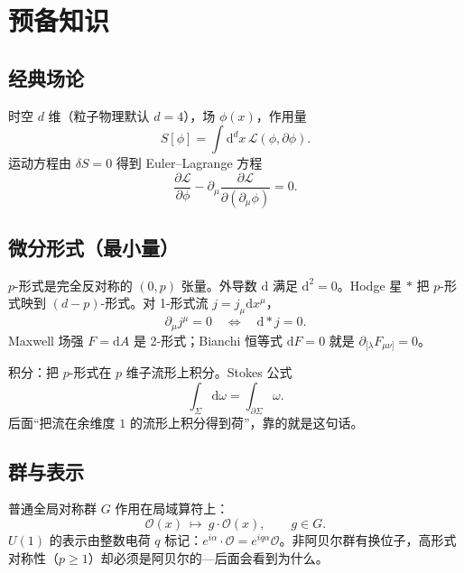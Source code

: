 \documentclass[11pt,a4paper]{article}
\theoremstyle{definition}
\theoremstyle{plain}
\theoremstyle{remark}
\newcommand{\dd}{\mathrm{d}}
\begin{document}
\section{预备知识}
\label{sec:prereq}

\subsection{经典场论}

时空 $d$ 维（粒子物理默认 $d=4$），场 $\phi(x)$，作用量
\begin{equation}
  S[\phi]=\int \dd^d x\,\mathcal{L}(\phi,\partial\phi).
\end{equation}
运动方程由 $\delta S=0$ 得到 Euler--Lagrange 方程
\begin{equation}
\label{eq:EL}
  \frac{\partial\mathcal{L}}{\partial\phi}-\partial_\mu\frac{\partial\mathcal{L}}{\partial(\partial_\mu\phi)}=0.
\end{equation}

\subsection{微分形式（最小量）}

$p$-形式是完全反对称的 $(0,p)$ 张量。外导数 $\dd$ 满足 $\dd^2=0$。Hodge 星 $*$ 把 $p$-形式映到 $(d-p)$-形式。对 1-形式流 $j=j_\mu\dd x^\mu$，
\begin{equation}
  \partial_\mu j^\mu=0 \quad\Longleftrightarrow\quad \dd{*}j=0.
\end{equation}
Maxwell 场强 $F=\dd A$ 是 2-形式；Bianchi 恒等式 $\dd F=0$ 就是 $\partial_{[\lambda}F_{\mu\nu]}=0$。

积分：把 $p$-形式在 $p$ 维子流形上积分。Stokes 公式
\begin{equation}
  \int_\Sigma \dd\omega=\int_{\partial\Sigma}\omega.
\end{equation}
后面``把流在余维度 $1$ 的流形上积分得到荷''，靠的就是这句话。

\subsection{群与表示}

普通全局对称群 $G$ 作用在局域算符上：
\begin{equation}
  \mathcal{O}(x)\ \mapsto\ g\cdot\mathcal{O}(x),\qquad g\in G.
\end{equation}
$U(1)$ 的表示由整数电荷 $q$ 标记：$e^{i\alpha}\cdot\mathcal{O}=e^{iq\alpha}\mathcal{O}$。非阿贝尔群有换位子，高形式对称性（$p\ge 1$）却必须是阿贝尔的---后面会看到为什么。
\end{document}
